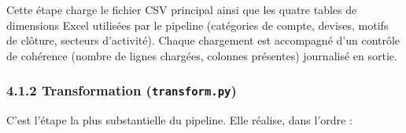 \documentclass[11pt,a4paper]{article}
\begin{document}
Cette étape charge le fichier CSV principal ainsi que les quatre tables
de dimensions Excel utilisées par le pipeline (catégories de compte,
devises, motifs de clôture, secteurs d'activité). Chaque chargement est
accompagné d'un contrôle de cohérence (nombre de lignes chargées,
colonnes présentes) journalisé en sortie.

\hypertarget{transformation-transform.py}{%
\subsubsection{\texorpdfstring{4.1.2 Transformation
(\texttt{transform.py})}{4.1.2 Transformation (transform.py)}}\label{transformation-transform.py}}

C'est l'étape la plus substantielle du pipeline. Elle réalise, dans
l'ordre :
\end{document}
